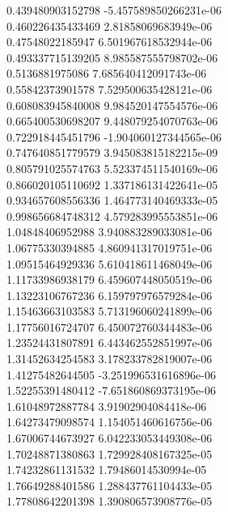 {0.439480903152798 -5.457589850266231e-06 \\
0.460226435433469 2.81858069683949e-06 \\
0.47548022185947 6.501967618532944e-06 \\
0.493337715139205 8.985587555798702e-06 \\
0.5136881975086 7.685640412091743e-06 \\
0.55842373901578 7.529500635428121e-06 \\
0.608083945840008 9.984520147554576e-06 \\
0.665400530698207 9.448079254070763e-06 \\
0.722918445451796 -1.904060127344565e-06 \\
0.747640851779579 3.945083815182215e-09 \\
0.805791025574763 5.523374511540169e-06 \\
0.866020105110692 1.337186131422641e-05 \\
0.934657608556336 1.464773140469333e-05 \\
0.998656684748312 4.579283995553851e-06 \\
1.04848406952988 3.940883289033081e-06 \\
1.06775330394885 4.860941317019751e-06 \\
1.09515464929336 5.610418611468049e-06 \\
1.11733986938179 6.459607448050519e-06 \\
1.13223106767236 6.159797976579284e-06 \\
1.15463663103583 5.713196060241899e-06 \\
1.17756016724707 6.450072760344483e-06 \\
1.23524431807891 6.443462552851997e-06 \\
1.31452634254583 3.178233782819007e-06 \\
1.41275482644505 -3.251996531616896e-06 \\
1.52255391480412 -7.651860869373195e-06 \\
1.61048972887784 3.91902904084418e-06 \\
1.64273479098574 1.154051460616756e-06 \\
1.67006744673927 6.042233053449308e-06 \\
1.70248871380863 1.729928408167325e-05 \\
1.74232861131532 1.79486014530994e-05 \\
1.76649288401586 1.288437761104433e-05 \\
1.77808642201398 1.390806573908776e-05 \\
}
